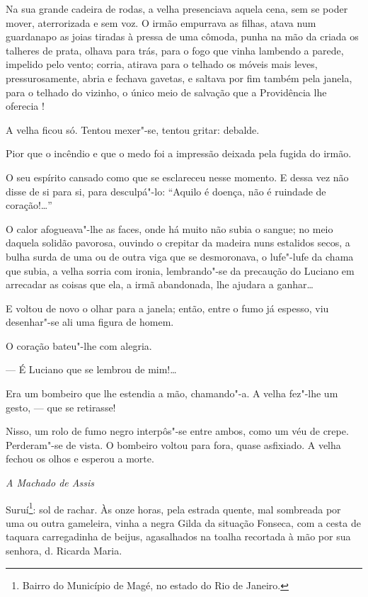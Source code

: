 Na sua grande cadeira de rodas, a velha presenciava aquela cena, sem se
poder mover, aterrorizada e sem voz. O irmão empurrava as filhas, atava
num guardanapo as joias tiradas à pressa de uma cômoda, punha na mão da
criada os talheres de prata, olhava para trás, para o fogo que vinha
lambendo a parede, impelido pelo vento; corria, atirava para o telhado
os móveis mais leves, pressurosamente, abria e fechava gavetas, e
saltava por fim também pela janela, para o telhado do vizinho, o único
meio de salvação que a Providência lhe oferecia !

A velha ficou só. Tentou mexer"-se, tentou gritar: debalde.

Pior que o incêndio e que o medo foi a impressão deixada pela fugida do
irmão.

O seu espírito cansado como que se esclareceu nesse momento. E dessa vez
não disse de si para si, para desculpá"-lo: ``Aquilo é doença, não é
ruindade de coração!\ldots{}''

O calor afogueava"-lhe as faces, onde há muito não subia o sangue; no
meio daquela solidão pavorosa, ouvindo o crepitar da madeira nuns
estalidos secos, a bulha surda de uma ou de outra viga que se
desmoronava, o lufe"-lufe da chama que subia, a velha sorria com ironia,
lembrando"-se da precaução do Luciano em arrecadar as coisas que ela, a
irmã abandonada, lhe ajudara a ganhar\ldots{}

E voltou de novo o olhar para a janela; então, entre o fumo já espesso,
viu desenhar"-se ali uma figura de homem.

O coração bateu"-lhe com alegria.

--- É Luciano que se lembrou de mim!\ldots{}

Era um bombeiro que lhe estendia a mão, chamando"-a. A velha fez"-lhe um
gesto, --- que se retirasse!

Nisso, um rolo de fumo negro interpôs"-se entre ambos, como um véu de
crepe. Perderam"-se de vista. O bombeiro voltou para fora, quase
asfixiado. A velha fechou os olhos e esperou a morte.


\hfill{}\emph{A Machado de Assis}

\bigskip

\noindent{}Suruí\footnote{Bairro do Município de Magé, no estado do Rio de Janeiro.}:
sol de rachar. Às onze horas, pela estrada quente, mal sombreada por uma
ou outra gameleira, vinha a negra Gilda da situação Fonseca, com a cesta
de taquara carregadinha de beijus, agasalhados na toalha recortada à mão
por sua senhora, d. Ricarda Maria.

